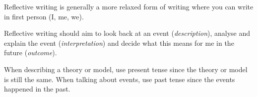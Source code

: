 Reflective writing is generally a more relaxed form of writing where you can write in first person (I, me, we).

Reflective writing should aim to look back at an event (\emph{description}), analyse and explain the event (\emph{interpretation}) and decide what this means for me in the future (\emph{outcome}).

\begin{note}
	When describing a theory or model, use present tense since the theory or model is still the same.
	When talking about events, use past tense since the events happened in the past.
\end{note}

